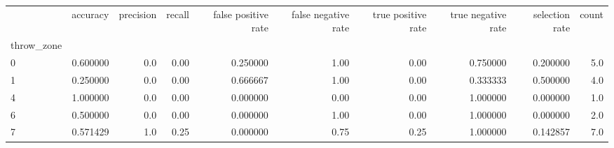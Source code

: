 \begin{tabular}{lrrrrrrrrr}
\toprule
{} &  accuracy &  precision &  recall &  false positive rate &  false negative rate &  true positive rate &  true negative rate &  selection rate &  count \\
throw\_zone &           &            &         &                      &                      &                     &                     &                 &        \\
\midrule
0          &  0.600000 &        0.0 &    0.00 &             0.250000 &                 1.00 &                0.00 &            0.750000 &        0.200000 &    5.0 \\
1          &  0.250000 &        0.0 &    0.00 &             0.666667 &                 1.00 &                0.00 &            0.333333 &        0.500000 &    4.0 \\
4          &  1.000000 &        0.0 &    0.00 &             0.000000 &                 0.00 &                0.00 &            1.000000 &        0.000000 &    1.0 \\
6          &  0.500000 &        0.0 &    0.00 &             0.000000 &                 1.00 &                0.00 &            1.000000 &        0.000000 &    2.0 \\
7          &  0.571429 &        1.0 &    0.25 &             0.000000 &                 0.75 &                0.25 &            1.000000 &        0.142857 &    7.0 \\
\bottomrule
\end{tabular}
